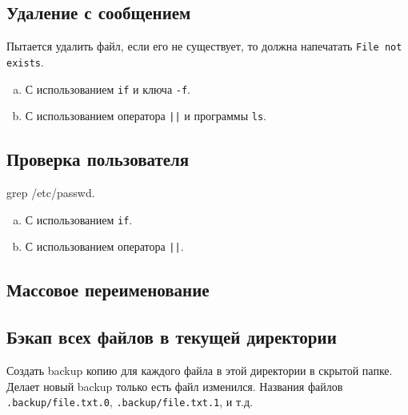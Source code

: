 \documentclass{article}
\begin{document}
\subsection{Удаление с сообщением}
Пытается удалить файл, если его не существует, то должна напечатать \texttt{File not exists}.
\begin{enumerate}[(a)]
\item С использованием \texttt{if} и ключа \texttt{-f}.
\item С использованием оператора \texttt{||} и программы \texttt{ls}.
\end{enumerate}


\subsection{Проверка пользователя}
grep /etc/passwd.
\begin{enumerate}[(a)]
\item С использованием \texttt{if}.
\item С использованием оператора \texttt{||}.
\end{enumerate}


\subsection{Массовое переименование}

\subsection{Бэкап всех файлов в текущей директории}
Создать backup копию для каждого файла в этой директории в скрытой папке. Делает новый backup только есть файл изменился. Названия файлов \texttt{.backup/file.txt.0}, \texttt{.backup/file.txt.1}, и т.д.
\end{document}

